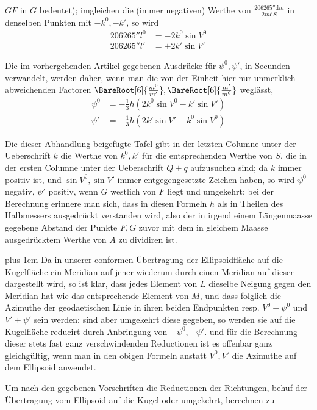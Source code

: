 %
\(GF\) in \(G\) bedeutet); imgleichen die (immer negativen) Werthe von \(\tfrac{206265''\mathrm{d}m}{2m\mathrm{d}S}\) in denselben Punkten mit \(-k^0,-k'\), so wird
\[
\begin{aligned}
206265''l^0&=-2k^0\sin V^0\\
206265''l'&=+2k'\sin V'
\end{aligned}
\]

Die im vorhergehenden Artikel gegebenen Ausdrücke für \(\psi^0,\psi'\), in Secunden verwandelt, werden daher, wenn man die von der Einheit hier nur unmerklich abweichenden Factoren \(\BareRoot[6]{\tfrac{m^0}{m'}},\BareRoot[6]{\tfrac{m'}{m^0}}\) weglässt,
\[
\begin{aligned}
\psi^0&=-\tfrac{1}{3}h(2k^0\sin V^0-k'\sin V')\\
\psi'&=-\tfrac{1}{3}h(2k'\sin V'-k^0\sin V^0)
\end{aligned}
\]

Die dieser Abhandlung beigefügte Tafel gibt in der letzten Columne unter der Ueberschrift \(k\) die Werthe von \(k^0,k'\) für die entsprechenden Werthe von \(S\), die in der ersten Columne unter der Ueberschrift \(Q+q\) aufzusuchen sind; da \(k\) immer positiv ist, und \(\sin V^0,\sin V'\) immer entgegengesetzte Zeichen haben, so wird \(\psi^0\) negativ, \(\psi'\) positiv, wenn \(G\) westlich von \(F\) liegt und umgekehrt: bei der Berechnung erinnere man sich, dass in diesen Formeln \(h\) als in Theilen des Halbmessers ausgedrückt verstanden wird, also der in irgend einem Längenmaasse gegebene Abstand der Punkte \(F,G\) zuvor mit dem in gleichem Maasse ausgedrücktem Werthe von \(A\) zu dividiren ist.

\begingroup\rightskip=0pt plus 1em
Da in unserer conformen Übertragung der Ellipsoidfläche auf die Kugelfläche ein Meridian auf jener wiederum durch einen Meridian auf dieser dargestellt wird, so ist klar, dass jedes Element von \(L\) dieselbe Neigung gegen den Meridian hat wie das entsprechende Element von \(M\), und dass folglich die Azimuthe der geodaetischen Linie in ihren beiden Endpunkten resp. \(V^0+\psi^0\) und \(V'+\psi'\) sein werden: sind aber umgekehrt diese gegeben, so werden sie auf die Kugelfläche reducirt durch Anbringung von \(-\psi^0,-\psi'\). und für die Berechnung dieser stets fast ganz verschwindenden Reductionen ist es offenbar ganz gleichgültig, wenn man in den obigen Formeln anstatt \(V^0,V'\) die Azimuthe auf dem Ellipsoid anwendet.\par\endgroup
{}
Um nach den gegebenen Vorschriften die Reductionen der Richtungen, behuf der Übertragung vom Ellipsoid auf die Kugel oder umgekehrt, berechnen zu
